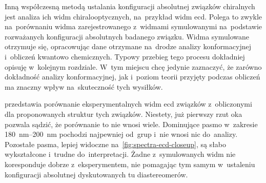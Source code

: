 Inną współczesną metodą ustalania konfiguracji absolutnej związków chiralnych jest analiza
  ich widm chiralooptycznych, na~przykład widm \gls{ecd}.
Polega to zwykle na~porównaniu widma zarejestrowanego z~widmami symulowanymi na~podstawie
  rozważanych konfiguracji absolutnych badanego związku.
Widma symulowane otrzymuje się, opracowując dane otrzymane na~drodze analizy konformacyjnej
  i~obliczeń kwantowo chemicznych.
Typowy przebieg tego procesu dokładniej opisuję w~kolejnym rozdziale. 
W~tym miejscu chcę jedynie zaznaczyć, że zarówno dokładność analizy konformacyjnej,
  jak i~poziom teorii przyjęty podczas obliczeń ma znaczny wpływ na~skuteczność tych wysiłków.

 przedstawia porównanie eksperymentalnych widm \gls{ecd} związków
   z~obliczonymi dla proponowanych struktur tych
  związków.
Niestety, już pierwszy rzut oka pozwala sądzić, że porównanie to nie wnosi wiele.
Dominujące pasmo w~zakresie \SIrange{180}{200}{\nano\meter} pochodzi najpewniej od~grup
   i~nie wnosi nic do~analizy.
Pozostałe pasma, lepiej widoczne na~\cref{fig:spectra-ecd-closeup}, są słabo wykształcone
  i~trudne do~interpretacji.
Żadne z~symulowanych widm nie koresponduje dobrze z~eksperymentem, nie pomagając tym samym
  w~ustaleniu konfiguracji absolutnej dyskutowanych tu diastereomerów.

